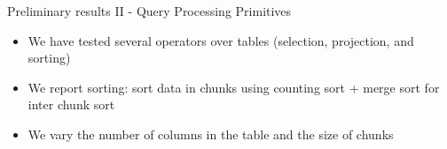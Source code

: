 \begin{block}{Preliminary results II - Query Processing Primitives}

  \begin{itemize}
  \item We have tested several operators over tables (selection, projection, and sorting)
  \item We report sorting: sort data in chunks using counting sort + merge sort for inter chunk sort
  \item We vary the number of columns in the table and the size of chunks
  \end{itemize}
  

\end{block}
